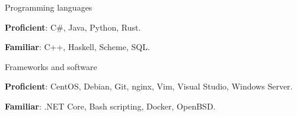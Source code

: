 
\begin{cventries}
  \cventry
    {} %
    {Programming languages} %
    {}
    {}
    {
      \begin{cvitems} %
         \item {\textbf{Proficient}: C\#, Java, Python, Rust.}
         \vspace{0.5mm}
         \item {\textbf{Familiar}: C++, Haskell, Scheme, SQL.}
      \end{cvitems}
    }
    
  \cventry
    {} %
    {Frameworks and software} %
    {}
    {}
    {
      \begin{cvitems} %
         \item {\textbf{Proficient}: CentOS, Debian, Git, nginx, Vim, Visual Studio, Windows Server.}
         \vspace{0.5mm}
         \item {\textbf{Familiar}: .NET Core, Bash scripting, Docker, OpenBSD.}
      \end{cvitems}
    }
\end{cventries}
